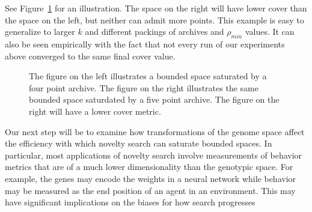 \documentclass[twoside]{article}
\begin{document}
See Figure~\ref{fig:local:conv} for an illustration.  The space on the right will have lower cover than the space on the left, but neither can admit more points.  This example is easy to generalize to larger $k$ and different packings of archives and $\rho_{min}$ values.  It can also be seen empirically with the fact that not every run of our experiments above converged to the same final cover value.  
%
\begin{figure}[ht]
  \center{}
  
  \caption{\label{fig:local:conv} The figure on the left illustrates a bounded space saturated by a four point archive.  The figure on the right illustrates the same bounded space saturdated by a five point archive.  The figure on the right will have a lower cover metric.}
\end{figure}

Our next step will be to examine how transformations of the genome space affect the efficiency with which novelty search can saturate bounded spaces.  In particular, most applications of novelty search involve measurements of behavior metrics that are of a much lower dimensionality than the genotypic space.  For example, the genes may encode the weights in a neural network while behavior may be measured as the end position of an agent in an environment.  This may have significant implications on the biases for how search progresses

\small



\end{document}
